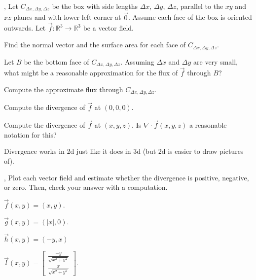 \documentclass[letter]{article}
\newcommand{\R}{\mathbb{R}}
\newcommand{\mat}[1]{\begin{bmatrix}#1\end{bmatrix}}
\renewcommand{\emph}[1]{{\color{defcolor} \textbf{\textit{##1}}}}
\begin{document}
	\sep
	Let $C_{\Delta x,\Delta y,\Delta z}$ be the box with side lengths
	$\Delta x$, $\Delta y$, $\Delta z$, parallel to the $xy$ and $xz$ planes
	and with lower left corner at $\vec 0$.  Assume each face of the box is
	oriented outwards.
	Let $\vec f:\R^3\to\R^3$ be
	a vector field.
	\begin{Enum}
		\item Find the normal vector and the surface area for each face of $C_{\Delta x,\Delta y,\Delta z}$.
		\item Let $B$ be the bottom face of $C_{\Delta x,\Delta y,\Delta z}$.  Assuming
			$\Delta x$ and $\Delta y$ are very small, what might be a reasonable
			approximation for the flux of $\vec f$ through $B$?
		\item Compute the approximate flux through $C_{\Delta x,\Delta y,\Delta z}$.
	\end{Enum}

	\vspace{-.8cm}

	\vspace{-.5cm}
	\begin{Enum}[resume]
		\item Compute the divergence of $\vec f$ at $(0,0,0)$.
		\item Compute the divergence of $\vec f$ at $(x,y,z)$.  Is $\nabla \cdot \vec f(x,y,z)$ a reasonable
			notation for this?
	\end{Enum}

	Divergence works in 2d just like it does in 3d (but 2d is easier to draw pictures of).

	\sep
	Plot each vector field and estimate whether the divergence is positive,
	negative, or zero.  Then, check your answer with a computation.
	\begin{Enum}
		\item $\vec f(x,y) = (x,y)$.
		\item $\vec g(x,y) = (|x|, 0)$.
		\item $\vec h(x,y) = (-y,x)$
		\item $\vec l(x,y) = \mat{\frac{-y}{\sqrt{x^2+y^2}}\\\frac{x}{\sqrt{x^2+y^2}}}$.
	\end{Enum}
\end{document}
